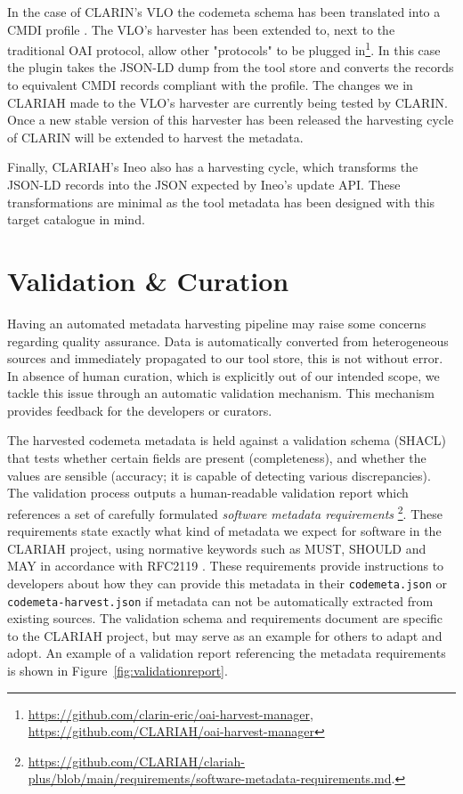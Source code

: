 \documentclass[a4paper,11pt]{article}
\begin{document}
In the case of CLARIN's VLO the codemeta schema has been translated into a CMDI
profile \citep{windhouwer2022component}. The VLO's harvester has been extended to, 
next to the traditional OAI protocol, allow other "protocols" to be plugged
in\footnote{\url{https://github.com/clarin-eric/oai-harvest-manager}, 
\url{https://github.com/CLARIAH/oai-harvest-manager}}. In this case the plugin takes
the JSON-LD dump from the tool store and converts the records to equivalent CMDI records compliant with
the profile. The changes we in CLARIAH made to the VLO's harvester are currently being tested by
CLARIN. Once a new stable version of this harvester has been released the harvesting
cycle of CLARIN will be extended to harvest the metadata.

Finally, CLARIAH's Ineo also has a harvesting cycle, which transforms the JSON-LD records
into the JSON expected by Ineo's update API. These transformations are minimal as the tool
metadata has been designed with this target catalogue in mind.

\section{Validation \& Curation}

Having an automated metadata harvesting pipeline may raise some concerns
regarding quality assurance. Data is automatically converted from heterogeneous
sources and immediately propagated to our tool store, this is not without
error. In absence of human curation, which is explicitly out of our intended
scope, we tackle this issue through an automatic validation mechanism. This mechanism provides
feedback for the developers or curators.

The harvested codemeta metadata is held against a validation schema (SHACL)
that tests whether certain fields are present (completeness), and whether the
values are sensible (accuracy; it is capable of detecting various
discrepancies). The validation process outputs a human-readable validation
report which references a set of carefully formulated \emph{software metadata
requirements}
\footnote{\url{https://github.com/CLARIAH/clariah-plus/blob/main/requirements/software-metadata-requirements.md}.}.
These requirements state exactly what kind of metadata we expect for software
in the CLARIAH project, using normative keywords such as \textsc{MUST}, \textsc{SHOULD} and \textsc{MAY}
in accordance with RFC2119 \citep{RFC2119}. These requirements provide
instructions to developers about how they can provide this metadata in
their \texttt{codemeta.json} or \texttt{codemeta-harvest.json} if metadata can not be
automatically extracted from existing sources. The validation schema and
requirements document are specific to the CLARIAH project, but may serve as an
example for others to adapt and adopt. An example of a validation report
referencing the metadata requirements is shown in
Figure~\ref{fig:validationreport}.
\end{document}
